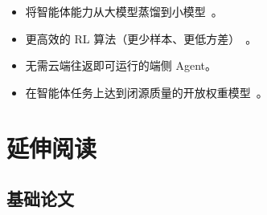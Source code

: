 \begin{itemize}
  \item 将智能体能力从大模型蒸馏到小模型~\cite{hinton2015distilling, kim2024distillation}。
  \item 更高效的 RL 算法（更少样本、更低方差）~\cite{schulman2017proximal}。
  \item 无需云端往返即可运行的端侧 Agent。
  \item 在智能体任务上达到闭源质量的开放权重模型~\cite{deepseek2025r1}。
\end{itemize}

\section{延伸阅读}
\label{further-reading}

\subsection{基础论文}
\label{foundational-papers}

